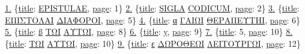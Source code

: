 \documentclass[
  letterpaper,
]{tufte-handout}
\newenvironment{Shaded}{\begin{snugshade}}{\end{snugshade}}
\newcommand{\DecValTok}[1]{\textcolor[rgb]{0.69,0.50,0.00}{#1}}
\newcommand{\ErrorTok}[1]{\textcolor[rgb]{0.75,0.01,0.01}{\underline{#1}}}
\newcommand{\FunctionTok}[1]{\textcolor[rgb]{0.39,0.29,0.61}{#1}}
\begin{document}
\begin{Shaded}
\begin{Highlighting}[]
\ErrorTok{1.} \FunctionTok{\{}\ErrorTok{\textquotesingle{}title\textquotesingle{}}\FunctionTok{:} \ErrorTok{\textquotesingle{}EPISTULAE\textquotesingle{}}\FunctionTok{,} \ErrorTok{\textquotesingle{}page\textquotesingle{}}\FunctionTok{:} \DecValTok{1}\FunctionTok{\}}
\ErrorTok{2.} \FunctionTok{\{}\ErrorTok{\textquotesingle{}title\textquotesingle{}}\FunctionTok{:} \ErrorTok{\textquotesingle{}SIGLA}  \ErrorTok{CODICUM\textquotesingle{}}\FunctionTok{,} \ErrorTok{\textquotesingle{}page\textquotesingle{}}\FunctionTok{:} \DecValTok{2}\FunctionTok{\}}
\ErrorTok{3.} \FunctionTok{\{}\ErrorTok{\textquotesingle{}title\textquotesingle{}}\FunctionTok{:} \ErrorTok{\textquotesingle{}ΕΠΙΣΤΟΛΑΙ} \ErrorTok{ΔΙΑΦΟΡΟΙ\textquotesingle{}}\FunctionTok{,} \ErrorTok{\textquotesingle{}page\textquotesingle{}}\FunctionTok{:} \DecValTok{5}\FunctionTok{\}}
\ErrorTok{4.} \FunctionTok{\{}\ErrorTok{\textquotesingle{}title\textquotesingle{}}\FunctionTok{:} \ErrorTok{\textquotesingle{}α} \ErrorTok{ΓΑΙΩΙ}  \ErrorTok{ΘΕΡΑΠΕΥΤΗI\textquotesingle{}}\FunctionTok{,} \ErrorTok{\textquotesingle{}page\textquotesingle{}}\FunctionTok{:} \DecValTok{6}\FunctionTok{\}}
\ErrorTok{5.} \FunctionTok{\{}\ErrorTok{\textquotesingle{}title\textquotesingle{}}\FunctionTok{:} \ErrorTok{\textquotesingle{}ß} \ErrorTok{ΤΩΙ}  \ErrorTok{ΑΥΤΩΙ\textquotesingle{}}\FunctionTok{,} \ErrorTok{\textquotesingle{}page\textquotesingle{}}\FunctionTok{:} \DecValTok{8}\FunctionTok{\}}
\ErrorTok{6.} \FunctionTok{\{}\ErrorTok{\textquotesingle{}title\textquotesingle{}}\FunctionTok{:} \ErrorTok{\textquotesingle{}y\textquotesingle{}}\FunctionTok{,} \ErrorTok{\textquotesingle{}page\textquotesingle{}}\FunctionTok{:} \DecValTok{9}\FunctionTok{\}}
\ErrorTok{7.} \FunctionTok{\{}\ErrorTok{\textquotesingle{}title\textquotesingle{}}\FunctionTok{:} \ErrorTok{\textquotesingle{}}\DecValTok{5}\ErrorTok{\textquotesingle{}}\FunctionTok{,} \ErrorTok{\textquotesingle{}page\textquotesingle{}}\FunctionTok{:} \DecValTok{10}\FunctionTok{\}}
\ErrorTok{8.} \FunctionTok{\{}\ErrorTok{\textquotesingle{}title\textquotesingle{}}\FunctionTok{:} \ErrorTok{\textquotesingle{}ΤΩΙ}  \ErrorTok{ΑΥΤΩΙ\textquotesingle{}}\FunctionTok{,} \ErrorTok{\textquotesingle{}page\textquotesingle{}}\FunctionTok{:} \DecValTok{10}\FunctionTok{\}}
\ErrorTok{9.} \FunctionTok{\{}\ErrorTok{\textquotesingle{}title\textquotesingle{}}\FunctionTok{:} \ErrorTok{\textquotesingle{}ε} \ErrorTok{ΔΩΡΟΘΕΩΙ}  \ErrorTok{ΛΕΙΤΟΥΡΓΩΙ\textquotesingle{}}\FunctionTok{,} \ErrorTok{\textquotesingle{}page\textquotesingle{}}\FunctionTok{:} \DecValTok{12}\FunctionTok{\}}

\end{Highlighting}
\end{Shaded}
\end{document}
